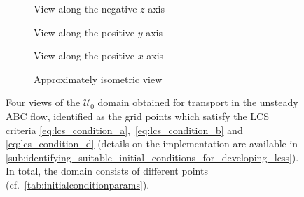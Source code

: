 \begin{figure}[htpb]
    \centering
    \begin{subfigure}[b]{0.475\textwidth}
        \centering
        \caption[]{{\small View along the negative $z$-axis}}
        \label{fig:unsteady_abd_z}
    \end{subfigure}
    \begin{subfigure}[b]{0.475\textwidth}
        \centering
        \caption[]{{\small View along the positive $y$-axis}}
        \label{fig:unsteady_abd_y}
    \end{subfigure}

    \begin{subfigure}[b]{0.475\textwidth}
        \centering
        \caption[]{{\small View along the positive $x$-axis}}
        \label{fig:unsteady_abd_x}
    \end{subfigure}
    \begin{subfigure}[b]{0.475\textwidth}
        \centering
        \caption[]{{\small Approximately isometric view}}
        \label{fig:unsteady_abd_isometric}
    \end{subfigure}
    \caption[Four views of the $\mathcal{U}_{0}$ domain obtained for transport
    in the unsteady ABC flow]
    {
        Four views of the $\mathcal{U}_{0}$ domain obtained for transport in the
        unsteady ABC flow, identified as the grid points which satisfy the LCS
        criteria \eqref{eq:lcs_condition_a},~\eqref{eq:lcs_condition_b} and~
        \eqref{eq:lcs_condition_d} (details on the implementation are available
        in
        \cref{sub:identifying_suitable_initial_conditions_for_developing_lcss}).
        In total, the domain consists of  different points
        (cf.\ \cref{tab:initialconditionparams}).
}
    \label{fig:unsteady_abd}
\end{figure}

